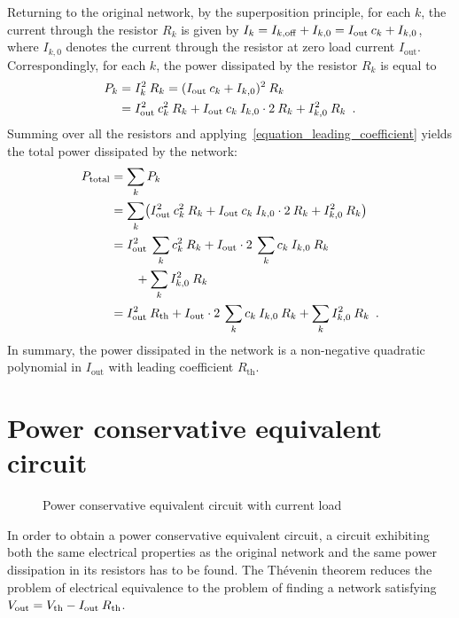 \documentclass[twoside]{IEEEtran}
\newcommand{\mult}{\nonscript\:}
\newcommand{\opoff}{{\operatorname{off}}}
\newcommand{\opout}{{\operatorname{out}}}
\newcommand{\opth}{{\operatorname{th}}}
\newcommand{\optotal}{{\operatorname{total}}}
\begin{document}
Returning to the original network, by the superposition principle, for each $k$, the current through the resistor $R_{k}$ is given by $I_{k} = I_{k, \opoff} + I_{k, 0} = I_{\opout} \mult c_{k} + I_{k, 0}$, where $I_{k, 0}$ denotes the current through the resistor at zero load current $I_{\opout}$.
Correspondingly, for each $k$, the power dissipated by the resistor $R_{k}$ is equal to
\begin{align*}
         P_{k}
     & = I_{k}^{2} \mult R_{k}
       = (I_{\opout} \mult c_{k} + I_{k, 0})^{2} \mult R_{k}
  \\ & = I_{\opout}^{2} \mult c_{k}^{2} \mult R_{k} + I_{\opout} \mult c_{k} \mult I_{k, 0} \cdot 2 \mult R_{k} + I_{k, 0}^{2} \mult R_{k}
  \enskip.
\end{align*}
Summing over all the resistors and applying~\eqref{equation_leading_coefficient} yields the total power dissipated by the network:
\begin{align}
         P_{\optotal}
     & = \sum_{k} P_{k}
  \nonumber \\ & = \sum_{k} \bigl( I_{\opout}^{2} \mult c_{k}^{2} \mult R_{k} + I_{\opout} \mult c_{k} \mult I_{k, 0} \cdot 2 \mult R_{k} + I_{k, 0}^{2} \mult R_{k} \bigr)
  \nonumber \\ & = I_{\opout}^{2} \mult \sum_{k} c_{k}^{2} \mult R_{k} + I_{\opout} \cdot 2 \mult \sum_{k} c_{k} \mult I_{k, 0} \mult R_{k} \nonumber \\ & \qquad + \sum_{k} I_{k, 0}^{2} \mult R_{k}
  \nonumber \\ & = I_{\opout}^{2} \mult R_{\opth} + I_{\opout} \cdot 2 \mult \sum_{k} c_{k} \mult I_{k, 0} \mult R_{k} + \sum_{k} I_{k, 0}^{2} \mult R_{k}
  \enskip.
  \label{equation_power_total}
\end{align}
In summary, the power dissipated in the network is a non-negative quadratic polynomial in $I_{\opout}$ with leading coefficient $R_{\opth}$.

\section{Power conservative equivalent circuit}
\label{section_circuit}

\begin{figure}
  \centering
  
  \caption{Power conservative equivalent circuit with current load}
  \label{equivalent_circuit}
\end{figure}

In order to obtain a power conservative equivalent circuit, a circuit exhibiting both the same electrical properties as the original network and the same power dissipation in its resistors has to be found.
The Th\'{e}venin theorem reduces the problem of electrical equivalence to the problem of finding a network satisfying $V_{\opout} = V_{\opth} - I_{\opout} \mult R_{\opth}$.
\end{document}
